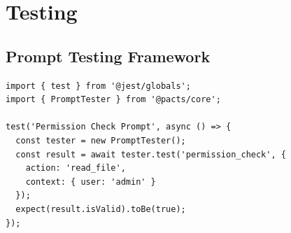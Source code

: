 \documentclass[11pt]{book}
\begin{document}
\chapter{Testing}

\section{Prompt Testing Framework}
\begin{verbatim}
import { test } from '@jest/globals';
import { PromptTester } from '@pacts/core';

test('Permission Check Prompt', async () => {
  const tester = new PromptTester();
  const result = await tester.test('permission_check', {
    action: 'read_file',
    context: { user: 'admin' }
  });
  expect(result.isValid).toBe(true);
});
\end{verbatim}
\end{document}
